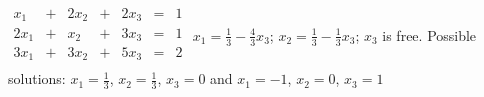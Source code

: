 {$\begin{array}{ccccccc}
x_1&+&2x_2&+&2x_3&=&1\\
2x_1&+&x_2&+&3x_3&=&1\\
3x_1&+&3x_2&+&5x_3&=&2\\
\end{array}$}
{$x_1=\frac13-\frac43x_3$; $x_2=\frac13-\frac13x_3$; $x_3$ is free. Possible solutions: $x_1 = \frac13$, $x_2=\frac13$, $x_3=0$ and $x_1 = -1$, $x_2 = 0$, $x_3=1$}